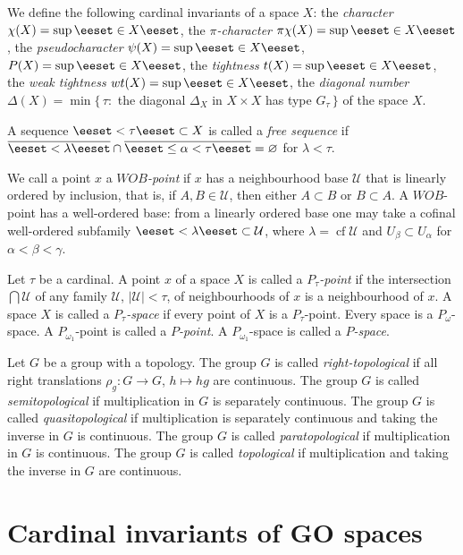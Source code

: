 \documentclass[preprint]{elsarticle}
\def\om{\omega}
\def\be{\beta}
\def\al{\alpha}
\def\ga{\gamma}
\def\la{\lambda}
\def\cl#1{\overline{#1}}
\def\es{\varnothing}
\def\set#1{\bbset#1\eeset}
\def\bbset#1:#2\eeset{\{#1\,:\,#2\}}
\def\cU{{\mathcal U}}
\def\D{\Delta}
\def\term#1{{\it #1}}
\theoremstyle{definition}
\theoremstyle{remark}
\def\cf{\operatorname{cf}}
\def\wob/{$WOB$}
\begin{document}
We define the following cardinal invariants of a space $X$:
the \term{character}
$\chi(X)=\sup \set{\chi(x,X): x\in X}$,
the \term{$\pi$-character}
$\pi\chi(X)=\sup \set{\pi\chi(x,X): x\in X}$,
the \term{pseudocharacter}
$\psi(X)=\sup \set{\psi(x,X): x\in X}$,
$P(X)=\sup\set{P(x,X): x\in X}$, 
the \term{tightness}
$t(X)=\sup\set{t(x,X): x\in X}$, 
the \term{weak tightness}
$wt(X)=\sup\set{wt(x,X): x\in X}$,
the \term{diagonal number}
$\D(X)=\min\{\,\tau:$ the diagonal $\D_X$ in $X\times X$ has type  $G_\tau\,\}$
of the space $X$.



A sequence $\set{x_\al:\al<\tau}\subset X$ is called a \term{free sequence} if $\cl{\set{x_\al:\al<\la}}\cap \cl{\set{x_\al:\la \leq \al<\tau}}=\es$ for $\la<\tau$.

We call a point $x$ a \term{\wob/-point} if $x$ has a neighbourhood base $\cU$ that is linearly ordered by inclusion, that is, if $A,B\in\cU$, then either $A\subset B$ or $B\subset A$.
A \wob/-point has a well-ordered base: from a linearly ordered base one may take a cofinal well-ordered subfamily $\set{U_\al:\al<\la}\subset \cU$, where $\la=\cf \cU$ and $U_\be\subset U_\al$ for $\al<\be<\ga$.


Let $\tau$ be a cardinal. A point $x$ of a space $X$ is called a \term{$P_\tau$-point} if the intersection $\bigcap\cU$ of any family $\cU$, $|\cU|<\tau$, of neighbourhoods of $x$ is a neighbourhood of $x$. A space $X$ is called a \term{$P_\tau$-space} if every point of $X$ is a $P_\tau$-point. Every space is a $P_\om$-space. A $P_{\om_1}$-point is called a \term{$P$-point}. A $P_{\om_1}$-space is called a \term{$P$-space}.

Let $G$ be a group with a topology. The group $G$ is called \term{right-topological} if all right translations $\rho_g: G\to G$, $h\mapsto hg$ are continuous. The group $G$ is called \term{semitopological} if multiplication in $G$ is separately continuous. The group $G$ is called \term{quasitopological} if multiplication is separately continuous and taking the inverse in $G$ is continuous. The group $G$ is called \term{paratopological} if multiplication in $G$ is continuous. The group $G$ is called \term{topological} if multiplication and taking the inverse in $G$ are continuous.









\section{Cardinal invariants of GO spaces} \label{sec:cfgos}
\end{document}
